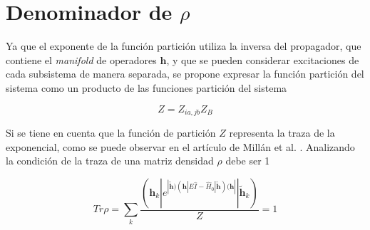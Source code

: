 \documentclass{beamer}
\begin{document}
\section{Denominador de $\rho$}
\small
\begin{frame}

Ya que el exponente de la función partición utiliza la inversa del propagador, 
que contiene el \textit{manifold} de operadores $\bm{h}$, y que se pueden considerar
excitaciones de cada subsistema de manera separada, se propone  expresar la 
función partición del sistema como un producto de las funciones partición del sistema

\begin{equation*}
  Z = Z_{ia,jb}  Z_B
\end{equation*}



\pause

Si se tiene en cuenta que la función de partición $Z$ representa la traza de 
la exponencial,  
como se puede observar en el artículo de Millán et al. . 
Analizando la condición de la traza de una matriz densidad $\rho$ debe ser 1 

\pause
\begin{equation*}
	Tr \rho =  \sum_k \frac{(\bm{h}_k|e^{| \bm{\widetilde{h}} ) (\bm{h}| E \hat{I} - \hat{H}_0 | \bm{\widetilde{h}} )   
  (\bm{h}|} |\bm{\widetilde{h}}_k) } 
	{Z} = 1
\end{equation*}


\end{frame}
\end{document}
